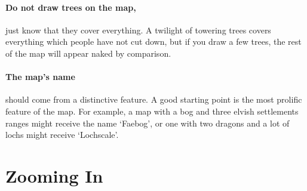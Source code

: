 \begin{multicols}{2}
\bigLine

\paragraph{Do not draw trees on the map,}
just know that they cover everything.
A twilight of towering trees covers everything which people have not cut down, but if you draw a few trees, the rest of the map will appear naked by comparison.

\paragraph{The map's name}
should come from a distinctive feature.
A good starting point is the most prolific feature of the map.
For example, a map with a bog and three elvish settlements ranges might receive the name `Faebog', or one with two dragons and a lot of lochs might receive `Lochscale'.

\end{multicols}

\section{Zooming In}
\label{mapCharacter}

